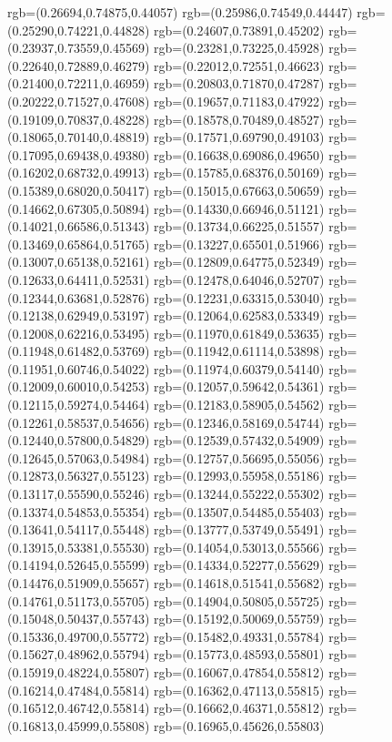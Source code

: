 {{		rgb=(0.26694,0.74875,0.44057)
		rgb=(0.25986,0.74549,0.44447)
		rgb=(0.25290,0.74221,0.44828)
		rgb=(0.24607,0.73891,0.45202)
		rgb=(0.23937,0.73559,0.45569)
		rgb=(0.23281,0.73225,0.45928)
		rgb=(0.22640,0.72889,0.46279)
		rgb=(0.22012,0.72551,0.46623)
		rgb=(0.21400,0.72211,0.46959)
		rgb=(0.20803,0.71870,0.47287)
		rgb=(0.20222,0.71527,0.47608)
		rgb=(0.19657,0.71183,0.47922)
		rgb=(0.19109,0.70837,0.48228)
		rgb=(0.18578,0.70489,0.48527)
		rgb=(0.18065,0.70140,0.48819)
		rgb=(0.17571,0.69790,0.49103)
		rgb=(0.17095,0.69438,0.49380)
		rgb=(0.16638,0.69086,0.49650)
		rgb=(0.16202,0.68732,0.49913)
		rgb=(0.15785,0.68376,0.50169)
		rgb=(0.15389,0.68020,0.50417)
		rgb=(0.15015,0.67663,0.50659)
		rgb=(0.14662,0.67305,0.50894)
		rgb=(0.14330,0.66946,0.51121)
		rgb=(0.14021,0.66586,0.51343)
		rgb=(0.13734,0.66225,0.51557)
		rgb=(0.13469,0.65864,0.51765)
		rgb=(0.13227,0.65501,0.51966)
		rgb=(0.13007,0.65138,0.52161)
		rgb=(0.12809,0.64775,0.52349)
		rgb=(0.12633,0.64411,0.52531)
		rgb=(0.12478,0.64046,0.52707)
		rgb=(0.12344,0.63681,0.52876)
		rgb=(0.12231,0.63315,0.53040)
		rgb=(0.12138,0.62949,0.53197)
		rgb=(0.12064,0.62583,0.53349)
		rgb=(0.12008,0.62216,0.53495)
		rgb=(0.11970,0.61849,0.53635)
		rgb=(0.11948,0.61482,0.53769)
		rgb=(0.11942,0.61114,0.53898)
		rgb=(0.11951,0.60746,0.54022)
		rgb=(0.11974,0.60379,0.54140)
		rgb=(0.12009,0.60010,0.54253)
		rgb=(0.12057,0.59642,0.54361)
		rgb=(0.12115,0.59274,0.54464)
		rgb=(0.12183,0.58905,0.54562)
		rgb=(0.12261,0.58537,0.54656)
		rgb=(0.12346,0.58169,0.54744)
		rgb=(0.12440,0.57800,0.54829)
		rgb=(0.12539,0.57432,0.54909)
		rgb=(0.12645,0.57063,0.54984)
		rgb=(0.12757,0.56695,0.55056)
		rgb=(0.12873,0.56327,0.55123)
		rgb=(0.12993,0.55958,0.55186)
		rgb=(0.13117,0.55590,0.55246)
		rgb=(0.13244,0.55222,0.55302)
		rgb=(0.13374,0.54853,0.55354)
		rgb=(0.13507,0.54485,0.55403)
		rgb=(0.13641,0.54117,0.55448)
		rgb=(0.13777,0.53749,0.55491)
		rgb=(0.13915,0.53381,0.55530)
		rgb=(0.14054,0.53013,0.55566)
		rgb=(0.14194,0.52645,0.55599)
		rgb=(0.14334,0.52277,0.55629)
		rgb=(0.14476,0.51909,0.55657)
		rgb=(0.14618,0.51541,0.55682)
		rgb=(0.14761,0.51173,0.55705)
		rgb=(0.14904,0.50805,0.55725)
		rgb=(0.15048,0.50437,0.55743)
		rgb=(0.15192,0.50069,0.55759)
		rgb=(0.15336,0.49700,0.55772)
		rgb=(0.15482,0.49331,0.55784)
		rgb=(0.15627,0.48962,0.55794)
		rgb=(0.15773,0.48593,0.55801)
		rgb=(0.15919,0.48224,0.55807)
		rgb=(0.16067,0.47854,0.55812)
		rgb=(0.16214,0.47484,0.55814)
		rgb=(0.16362,0.47113,0.55815)
		rgb=(0.16512,0.46742,0.55814)
		rgb=(0.16662,0.46371,0.55812)
		rgb=(0.16813,0.45999,0.55808)
		rgb=(0.16965,0.45626,0.55803)
}}
